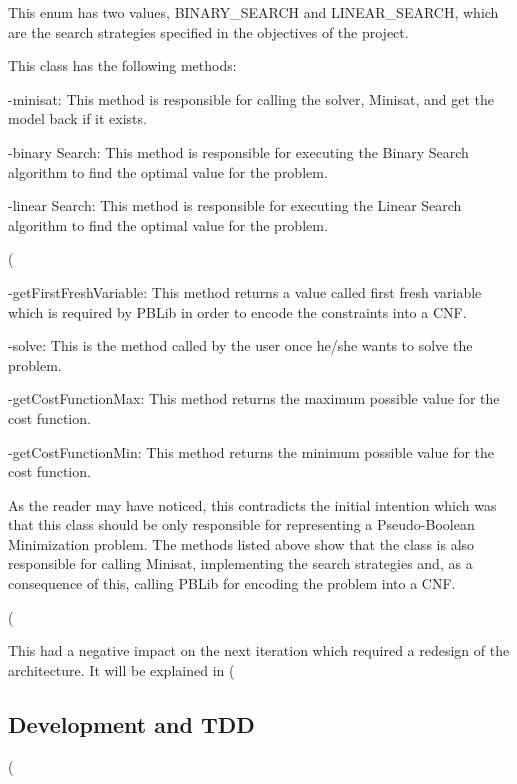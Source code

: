 This enum has two values, BINARY\_SEARCH and LINEAR\_SEARCH, which are the search strategies specified in the objectives of the project.  



This class has the following methods: 

-minisat: This method is responsible for calling the solver, Minisat, and get the model back if it exists.  

-binary Search: This method is responsible for executing the Binary Search algorithm to find the optimal value for the problem.  

-linear Search: This method is responsible for executing the Linear Search algorithm to find the optimal value for the problem.  

(%

-getFirstFreshVariable: This method returns a value called first fresh variable which is required by PBLib in order to encode the constraints into a CNF.  

-solve: This is the method called by the user once he/she wants to solve the problem. 

-getCostFunctionMax: This method returns the maximum possible value for the cost function.  

-getCostFunctionMin: This method returns the minimum possible value for the cost function.  



As the reader may have noticed, this contradicts the initial intention which was that this class should be only responsible for representing a Pseudo-Boolean Minimization problem. The methods listed above show that the class is also responsible for calling Minisat, implementing the search strategies and, as a consequence of this, calling PBLib for encoding the problem into a CNF.  

(%

This had a negative impact on the next iteration which required a redesign of the architecture. It will be explained in (%

\subsection{Development and TDD}

(%

